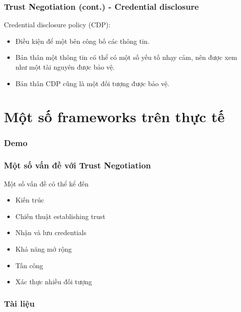 \documentclass[11pt]{beamer}
\begin{document}
\begin{frame}
\frametitle{Trust Negotiation (cont.) - Credential disclosure}
Credential disclosure policy (CDP):
\begin{itemize}
\item Điều kiện để một bên công bố các thông tin.
\item Bản thân một thông tin có thể có một số yếu tố nhạy cảm, nên được xem như một tài nguyên được bảo vệ.
\item Bản thân CDP cũng là một đối tượng được bảo vệ.
\end{itemize}
\end{frame}

\section{Một số frameworks trên thực tế}
\begin{frame}
\frametitle{Demo}
\end{frame}

\begin{frame}
\frametitle{Một số vấn đề với Trust Negotiation}
Một số vấn đề có thể kể đến\cite{10.1007/3-540-44875-6_20}
\begin{itemize}
\item Kiến trúc%
\item Chiến thuật establishing trust
\item Nhận và lưu credentials
\item Khả năng mở rộng
\item Tấn công
\item Xác thực nhiều đối tượng
\end{itemize}
\end{frame}

\begin{frame}
\frametitle{Tài liệu}
\printbibliography
\end{frame}
\end{document}
